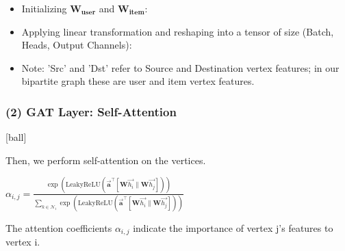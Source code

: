 \documentclass{beamer}
\begin{document}

\begin{frame}[fragile]
\begin{itemize}
\frametitle{(1) Linear Layer: Code}
[ball]

\item Initializing $\mathbf{W_{\text{user}}}$ and $\mathbf{W_{\text{item}}}$:



\item Applying linear transformation and reshaping into a tensor of size (Batch, Heads, Output Channels):



\item Note: 'Src' and 'Dst' refer to Source and Destination vertex features; in our bipartite graph these are user and item vertex features.

\end{itemize}
\end{frame}


\begin{frame}[fragile]
\begin{itemize}
\frametitle{(2) GAT Layer: Self-Attention}
[ball]

\item Then, we perform self-attention on the vertices. 

\vspace{0.2cm}

\begin{center}
    \item[] $\alpha_{i,j} = \frac{\exp\left(\mathrm{LeakyReLU}\left( \overrightarrow{\mathbf{a}}^{\top}
    [\mathbf{W}\overrightarrow{h_{i}}\|
    \mathbf{W}\overrightarrow{h_{j}}]
\right)\right)}
{\sum_{k \in \mathcal{N}_{i}}
\exp\left(\mathrm{LeakyReLU}\left(
\overrightarrow{\mathbf{a}}^{\top}
    [\mathbf{W}\overrightarrow{h_{i}}\|
    \mathbf{W}\overrightarrow{h_{j}}]
\right)\right)}$
\end{center}

\vspace{0.5cm}

\item The attention coefficients $\alpha_{i,j}$ indicate the importance of vertex j’s features to vertex i.

\end{itemize}
\end{frame}
\end{document}
